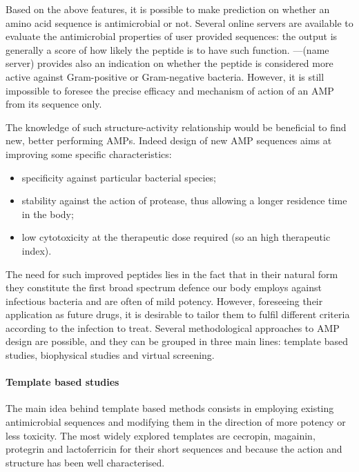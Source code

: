 \documentclass[a4paper,11pt]{extreport}
\begin{document}
%
Based on the above features, it is possible to make prediction on whether an amino acid sequence is antimicrobial or not. Several online servers are available to evaluate the antimicrobial properties of user provided sequences: the output is generally a score of how likely the peptide is to have such function. ---(name server) provides also an indication on whether the peptide is considered more active against Gram-positive or Gram-negative bacteria.
%
However, it is still impossible to foresee the precise efficacy and mechanism of action of an AMP from its sequence only.

The knowledge of such structure-activity relationship would be beneficial to find new, better performing AMPs. Indeed design of new AMP sequences aims at improving some specific characteristics:
\begin{itemize}
\item specificity against particular bacterial species;
\item stability against the action of protease, thus allowing a longer residence time in the body;
\item low cytotoxicity at the therapeutic dose required (so an high therapeutic index).
\end{itemize}
The need for such improved peptides lies in the fact that in their natural form they constitute the first broad spectrum defence our body employs against infectious bacteria and are often of mild potency. However, foreseeing their application as future drugs, it is desirable to tailor them to fulfil different criteria according to the infection to treat.
%
Several methodological approaches to AMP design are possible, and they can be grouped in three main lines: template based studies, biophysical studies and virtual screening.\cite{FjellYear?}


\paragraph{Template based studies}
The main idea behind template based methods consists in employing existing antimicrobial sequences and modifying them in the direction of more potency or less toxicity. The most widely explored templates are cecropin, magainin, protegrin and lactoferricin for their short sequences and because the action and structure has been well characterised.\cite{Wiradharma2011,Huang2010,Pag2008,Wang2015}
\end{document}
